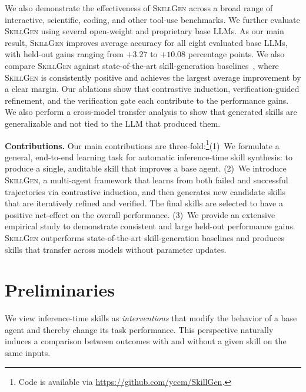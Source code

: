 \documentclass{article}
\begin{document}
We also demonstrate the effectiveness of \textsc{SkillGen} across a broad range of interactive, scientific, coding, and other tool-use benchmarks. We further evaluate \textsc{SkillGen} using several open-weight and proprietary base LLMs. As our main result, \textsc{SkillGen} improves average accuracy for all eight evaluated base LLMs, with held-out gains ranging from $+3.27$ to $+10.08$ percentage points. We also compare \textsc{SkillGen} against state-of-the-art skill-generation baselines~\citep{ni2026trace2skill,wang2026skillx,alzubi2026evoskill,zhang2026evoskills}, where \textsc{SkillGen} is consistently positive and achieves the largest average improvement by a clear margin. Our ablations show that contrastive induction, verification-guided refinement, and the verification gate each contribute to the performance gains. We also perform a cross-model transfer analysis to show that generated skills are generalizable and not tied to the LLM that produced them.

\noindent\textbf{Contributions.}
Our main contributions are three-fold:\footnote{Code is available via \url{https://github.com/yccm/SkillGen}. }{(1)}~We formulate a general, end-to-end learning task for automatic inference-time skill synthesis: to produce a single, auditable skill that improves a base agent. {(2)}~We introduce \textsc{SkillGen}, a multi-agent framework that learns from both failed and successful trajectories via contrastive induction, and then generates new candidate skills that are iteratively refined and verified. The final skills are selected to have a positive net-effect on the overall performance. {(3)}~We provide an extensive empirical study to demonstrate consistent and large held-out performance gains. \textsc{SkillGen} outperforms state-of-the-art skill-generation baselines and produces skills that transfer across models without parameter updates.




\section{Preliminaries}
\label{sec:prelim}



We view inference-time skills as \emph{interventions} that modify the behavior of a base agent and thereby change its task performance. This perspective naturally induces a comparison between outcomes with and without a given skill on the same inputs.
\end{document}
